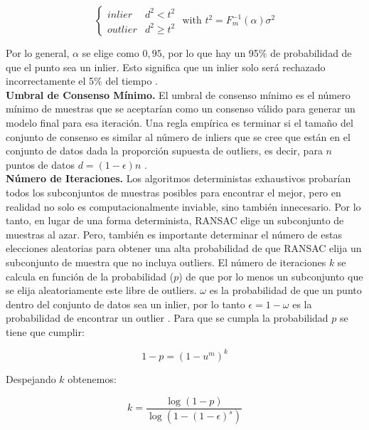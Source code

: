 $$
\left\{
\begin{array}{ll}
	inlier & d^2 < t^2\\
	outlier & d^2 \geq t^2
\end{array}
\right.
\mbox{ with } t^2 = F_{m}^{-1}(\alpha)\sigma^2
$$

Por lo general, $\alpha$ se elige como $0,95$, por lo que hay un 95\% de probabilidad de que el punto sea un inlier. Esto significa que un inlier solo será rechazado incorrectamente el 5\% del tiempo \cite{RichardAndrew}.\\

\textbf{Umbral de Consenso Mínimo.}
El umbral de consenso mínimo es el número mínimo de muestras que se aceptarían como un consenso válido para generar un modelo final para esa iteración. Una regla empírica es terminar si el tamaño del conjunto de consenso es similar al número de inliers que se cree que están en el conjunto de datos dada la proporción supuesta de outliers, es decir, para $n$ puntos de datos $d = (1 - \epsilon)n$ \cite{RichardAndrew}.\\

\textbf{Número de Iteraciones.}
Los algoritmos deterministas exhaustivos probarían todos los subconjuntos de muestras posibles para encontrar el mejor, pero en realidad no solo es computacionalmente inviable, sino también innecesario. Por lo tanto, en lugar de una forma determinista, RANSAC elige un subconjunto de muestras al azar. Pero, también es importante determinar el número de estas elecciones aleatorias para obtener una alta probabilidad de que RANSAC elija un subconjunto de muestra que no incluya outliers.
El número de iteraciones $k$ se calcula en función de la probabilidad ($p$) de que por lo menos un subconjunto que se elija aleatoriamente este libre de outliers. $\omega$ es la probabilidad de que un punto dentro del conjunto de datos sea un inlier, por lo tanto $\epsilon = 1-\omega$ es la probabilidad de encontrar un outlier \cite{PabloJuan}. Para que se cumpla la probabilidad $p$ se tiene que cumplir:

$$1 - p = (1 - u^m)^k$$

Despejando $k$ obtenemos:

$$k = \frac{\log(1 - p)}{\log(1 - (1 - \epsilon)^s)}$$
